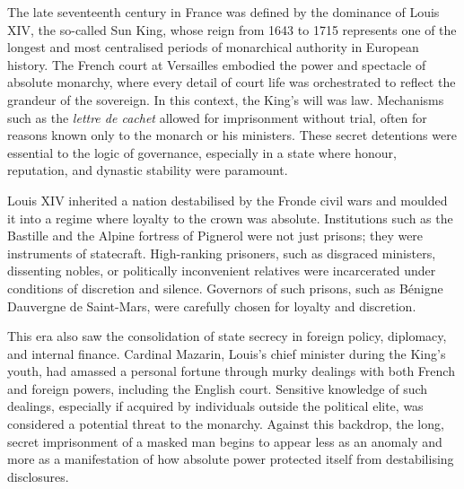 \begin{historical}
The late seventeenth century in France was defined by the dominance of Louis XIV, the so-called Sun King, whose reign from 1643 to 1715 represents one of the longest and most centralised periods of monarchical authority in European history. The French court at Versailles embodied the power and spectacle of absolute monarchy, where every detail of court life was orchestrated to reflect the grandeur of the sovereign. In this context, the King's will was law. Mechanisms such as the \textit{lettre de cachet} allowed for imprisonment without trial, often for reasons known only to the monarch or his ministers. These secret detentions were essential to the logic of governance, especially in a state where honour, reputation, and dynastic stability were paramount.

Louis XIV inherited a nation destabilised by the Fronde civil wars and moulded it into a regime where loyalty to the crown was absolute. Institutions such as the Bastille and the Alpine fortress of Pignerol were not just prisons; they were instruments of statecraft. High-ranking prisoners, such as disgraced ministers, dissenting nobles, or politically inconvenient relatives were incarcerated under conditions of discretion and silence. Governors of such prisons, such as Bénigne Dauvergne de Saint-Mars, were carefully chosen for loyalty and discretion.

This era also saw the consolidation of state secrecy in foreign policy, diplomacy, and internal finance. Cardinal Mazarin, Louis's chief minister during the King's youth, had amassed a personal fortune through murky dealings with both French and foreign powers, including the English court. Sensitive knowledge of such dealings, especially if acquired by individuals outside the political elite, was considered a potential threat to the monarchy. Against this backdrop, the long, secret imprisonment of a masked man begins to appear less as an anomaly and more as a manifestation of how absolute power protected itself from destabilising disclosures.
\end{historical}